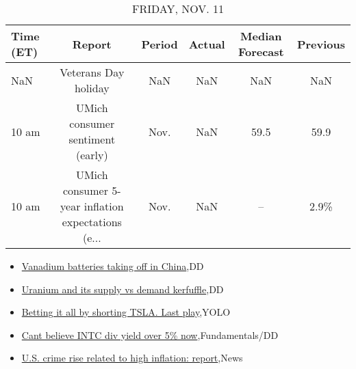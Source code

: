 \documentclass{article}%
\begin{document}
%


\begin{table}[htbp]%
\caption{FRIDAY, NOV. 11}%
\centering%
\begin{adjustbox}{width=1\textwidth}%
\begin{tabular}{lccccc}
\toprule
Time (ET) &                                             Report & Period & Actual & Median Forecast & Previous \\
\midrule
      NaN &                               Veterans Day holiday &    NaN &    NaN &             NaN &      NaN \\
    10 am &                   UMich consumer sentiment (early) &   Nov. &    NaN &            59.5 &     59.9 \\
    10 am & UMich consumer 5-year inflation expectations (e... &   Nov. &    NaN &              -- &     2.9\% \\
\bottomrule
\end{tabular}
%
\end{adjustbox}%
\end{table}

%
\begin{itemize}%
\item%
\href{https://reddit.com/r/wallstreetbets/comments/yqiip6/vanadium\_batteries\_taking\_off\_in\_china/}{Vanadium batteries taking off in China},DD%
\item%
\href{https://reddit.com/r/wallstreetbets/comments/yqidju/uranium\_and\_its\_supply\_vs\_demand\_kerfuffle/}{Uranium and its supply vs demand kerfuffle},DD%
\item%
\href{https://reddit.com/r/wallstreetbets/comments/yqhn97/betting\_it\_all\_by\_shorting\_tsla\_last\_play/}{Betting it all by shorting TSLA. Last play},YOLO%
\item%
\href{https://reddit.com/r/StockMarket/comments/yqhp5n/cant\_believe\_intc\_div\_yield\_over\_5\_now/}{Cant believe INTC div yield over 5\% now},Fundamentals/DD%
\item%
\href{https://reddit.com/r/Economics/comments/yqds9w/us\_crime\_rise\_related\_to\_high\_inflation\_report/}{U.S. crime rise related to high inflation: report},News%
\end{itemize}%
\end{document}
